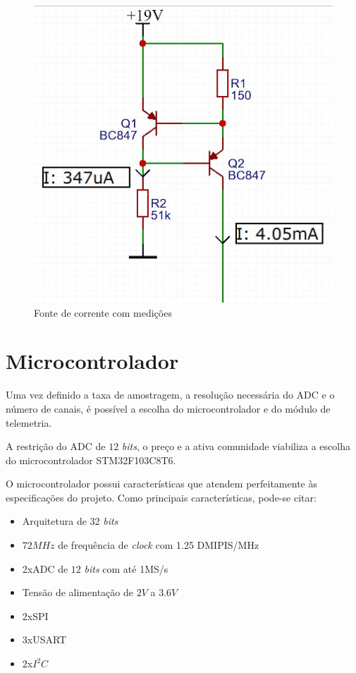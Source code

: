 \documentclass[
	12pt,				%
	openright,			%
	twoside,			%
	a4paper,			%
	english,			%
	french,				%
	spanish,			%
	brazil,				%
	]{abntex2}
\begin{document}
		\begin{figure}[!ht]
			\centering
			\includegraphics[scale = 0.3]{../Fotos/fonteCorrente2.jpg}
			\caption{Fonte de corrente com medições}
		\end{figure}

	\section{Microcontrolador}
		Uma vez definido a taxa de amostragem, a resolução necessária do
		ADC e o número de canais, é possível a escolha do
		microcontrolador e do módulo de telemetria.

		A restrição do ADC de $12$ \textit{bits}, o preço e a ativa comunidade viabiliza a escolha do microcontrolador STM32F103C8T6.\cite{stm}

		O microcontrolador possui características que
		atendem perfeitamente às especificações do projeto. Como
		principais características, pode-se citar:

		\begin{itemize}
			\item Arquitetura de 32 \textit{bits}
			\item $72MHz$ de frequência de \textit{clock} com 1.25 DMIPIS/MHz
			\item 2xADC de $12$ \textit{bits} com até 1MS/s
			\item Tensão de alimentação de $2V$ a $3.6V$
			\item 2xSPI
			\item 3xUSART
			\item 2x$I^2C$
		\end{itemize}
\end{document}
